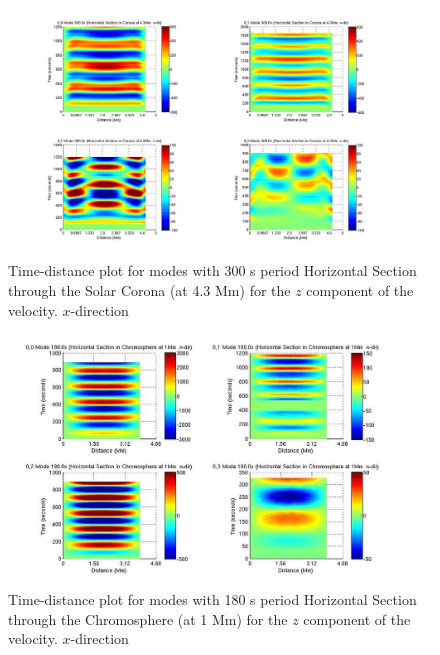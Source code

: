 \documentclass[preprint,authoryear,12pt]{elsarticle}
\begin{document}
\begin{figure}[h]
\includegraphics[scale=0.9]{imrescale/dt_300_hor_x_4p3Mm.jpg}
\caption{Time-distance plot for modes with 300 s period Horizontal Section through the Solar Corona (at 4.3 Mm) for the $z$ component of the velocity. $x$-direction}
\end{figure}


\begin{figure}[h]
\includegraphics[scale=0.9]{imrescale/dt_180_horiz_x_1Mm.jpg}
\caption{Time-distance plot for modes with 180 s period Horizontal Section through the Chromosphere (at 1 Mm) for the $z$ component of the velocity. $x$-direction}
\label{Fig14}
\end{figure}
\end{document}
